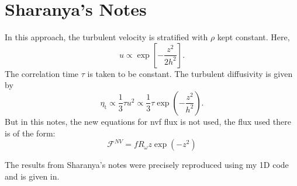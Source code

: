\documentclass[a4paper,10pt]{article}
\newcommand{\Flux}{\bm{\mathcal{F}}}
\newcommand{\1}{_\mathrm{1}}					   	%
\newcommand{\2}{_\mathrm{2}}					   	%
\newcommand{\etat}{\eta_\mathrm{t}}			   	%
\begin{document}
\section{Sharanya's Notes}
In this approach, the turbulent velocity is stratified with \( \rho \) kept constant. Here,
\begin{equation*}
u \propto \exp{\left[-\frac{z^2}{2h^2}\right]}.
\end{equation*}
The correlation time \( \tau \) is taken to be constant. The turbulent diffusivity is given by
\begin{equation}
  \label{etat}
  \etat \propto \frac{1}{3} \tau u^2 \propto \frac{1}{3} \tau  \exp{\left(-\frac{z^2}{h^2}\right)}.
\end{equation} 
But in this notes, the new equations for nvf flux is not used, the flux used there is of the form:
\begin{equation}
    \Flux^{NV}= f R_{\omega} z \exp{(-z^2)}
\end{equation}


The results from Sharanya's notes were precisely reproduced using my 1D code and is given in.
\end{document}
